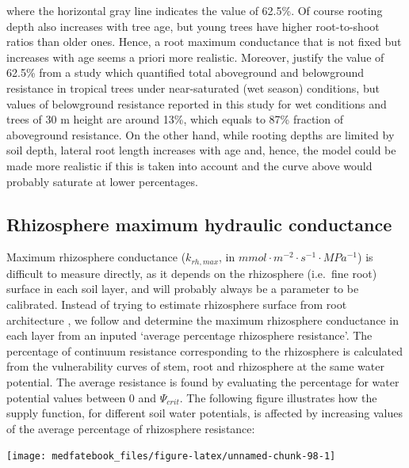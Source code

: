 \documentclass[]{book}
\begin{document}
where the horizontal gray line indicates the value of 62.5\%. Of course rooting depth also increases with tree age, but young trees have higher root-to-shoot ratios than older ones. Hence, a root maximum conductance that is not fixed but increases with age seems a priori more realistic. Moreover, \citet{Christoffersen2016} justify the value of 62.5\% from a study which quantified total aboveground and belowground resistance in tropical trees \citep{Fisher2006} under near-saturated (wet season) conditions, but values of belowground resistance reported in this study for wet conditions and trees of 30 m height are around 13\%, which equals to 87\% fraction of aboveground resistance. On the other hand, while rooting depths are limited by soil depth, lateral root length increases with age and, hence, the model could be made more realistic if this is taken into account and the curve above would probably saturate at lower percentages.

\hypertarget{rhizosphere-maximum-hydraulic-conductance}{%
\subsection{Rhizosphere maximum hydraulic conductance}\label{rhizosphere-maximum-hydraulic-conductance}}

Maximum rhizosphere conductance (\(k_{rh, max}\), in \(mmol \cdot m^{-2} \cdot s^{-1} \cdot MPa^{-1}\)) is difficult to measure directly, as it depends on the rhizosphere (i.e.~fine root) surface in each soil layer, and will probably always be a parameter to be calibrated. Instead of trying to estimate rhizosphere surface from root architecture \citep{Sperry1998}, we follow \citet{Sperry2016a} and determine the maximum rhizosphere conductance in each layer from an inputed `average percentage rhizosphere resistance'. The percentage of continuum resistance corresponding to the rhizosphere is calculated from the vulnerability curves of stem, root and rhizosphere at the same water potential. The average resistance is found by evaluating the percentage for water potential values between 0 and \(\Psi_{crit}\). The following figure illustrates how the supply function, for different soil water potentials, is affected by increasing values of the average percentage of rhizosphere resistance:

\begin{center}\texttt{[image: medfatebook\_files/figure-latex/unnamed-chunk-98-1]} \end{center}
\end{document}
